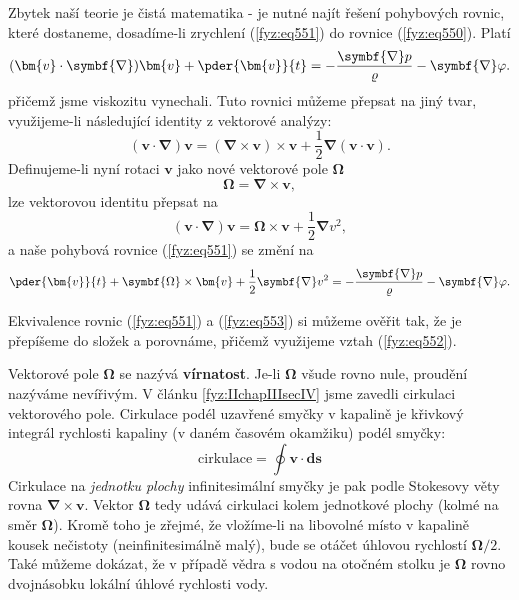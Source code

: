     Zbytek naší teorie je čistá matematika - je nutné najít řešení pohybových rovnic, které 
    dostaneme, dosadíme-li zrychlení (\ref{fyz:eq551}) do rovnice (\ref{fyz:eq550}). Platí
    \begin{equation}\label{fyz:eq551}
      (\bm{v}\cdot\symbf{\nabla})\bm{v}+\pder{\bm{v}}{t} 
        = -\dfrac{\symbf{\nabla}p}{\varrho} -\symbf{\nabla}\varphi.
    \end{equation}
    přičemž jsme viskozitu vynechali. Tuto rovnici můžeme přepsat na jiný tvar, využijeme-li 
    následující identity z vektorové analýzy:
    \begin{equation*}
      (\bm{v}\cdot\symbf{\nabla})\bm{v} 
        = (\symbf{\nabla}\times\bm{v})\times\bm{v} + \frac{1}{2}\symbf{\nabla}(\bm{v}\cdot\bm{v}).
    \end{equation*}
    Definujeme-li nyní rotaci \(\bm{v}\) jako nové vektorové pole \(\symbf{\Omega}\)  
    \begin{equation}\label{fyz:eq552}
      \symbf{\Omega} = \symbf{\nabla}\times\bm{v},
    \end{equation}
    lze vektorovou identitu přepsat na
    \begin{equation*}
      (\bm{v}\cdot\symbf{\nabla})\bm{v} 
        = \symbf{\Omega}\times\bm{v} + \frac{1}{2}\symbf{\nabla}v^2,
    \end{equation*}
    a naše pohybová rovnice (\ref{fyz:eq551}) se změní na
    \begin{equation}\label{fyz:eq553}
      \pder{\bm{v}}{t} + \symbf{\Omega}\times\bm{v} + \frac{1}{2}\symbf{\nabla}v^2
        = -\dfrac{\symbf{\nabla}p}{\varrho} -\symbf{\nabla}\varphi.
    \end{equation}
    
    Ekvivalence rovnic (\ref{fyz:eq551}) a (\ref{fyz:eq553}) si můžeme ověřit tak, že je přepíšeme 
    do složek a porovnáme, přičemž využijeme vztah (\ref{fyz:eq552}).
    
    Vektorové pole \(\symbf{\Omega}\) se nazývá \textbf{vírnatost}. Je-li \(\symbf{\Omega}\) všude 
    rovno nule, proudění nazýváme nevířivým. V článku \ref{fyz:IIchapIIIsecIV} jsme zavedli 
    cirkulaci vektorového pole. Cirkulace podél uzavřené smyčky v kapalině je křivkový integrál 
    rychlosti kapaliny (v daném časovém okamžiku) podél smyčky:
    \begin{equation*}
      \text{cirkulace} = \oint\bm{v}\cdot\bm{ds}
    \end{equation*}
    Cirkulace na \emph{jednotku plochy} infinitesimální smyčky je pak podle Stokesovy věty rovna 
    \(\symbf{\nabla}\times\bm{v}\). Vektor \(\symbf{\Omega}\) tedy udává cirkulaci kolem jednotkové 
    plochy (kolmé na směr \(\symbf{\Omega}\)). Kromě toho je zřejmé, že vložíme-li na libovolné 
    místo v kapalině kousek nečistoty (neinfinitesimálně malý), bude se otáčet úhlovou rychlostí 
    \(\symbf{\Omega}/2\). Také můžeme dokázat, že v případě vědra s vodou na otočném stolku je 
    \(\symbf{\Omega}\) rovno dvojnásobku lokální úhlové rychlosti vody.
    
